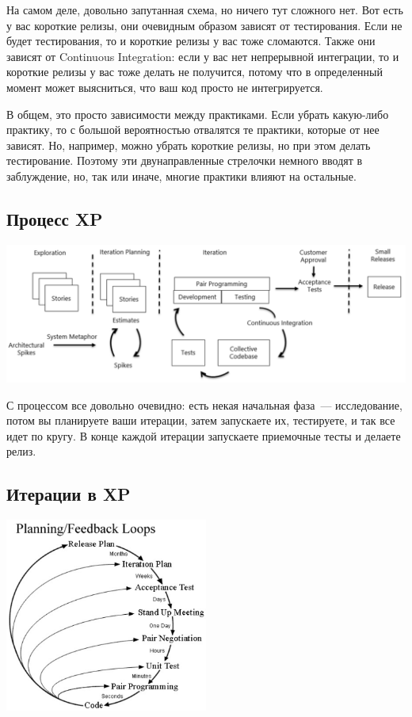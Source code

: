 \documentclass{../../text-style}
\begin{document}
На самом деле, довольно запутанная схема, но ничего тут сложного нет. Вот есть у вас короткие релизы, они очевидным образом зависят от тестирования. Если не будет тестирования, то и короткие релизы у вас тоже сломаются. Также они зависят от Continuous Integration: если у вас нет непрерывной интеграции, то и короткие релизы у вас тоже делать не получится, потому что в определенный момент может выясниться, что ваш код просто не интегрируется.

В общем, это просто зависимости между практиками. Если убрать какую-либо практику, то с большой вероятностью отвалятся те практики, которые от нее зависят. Но, например, можно убрать короткие релизы, но при этом делать тестирование. Поэтому эти двунаправленные стрелочки немного вводят в заблуждение, но, так или иначе, многие практики влияют на остальные.

\subsection{Процесс XP}

\begin{center}
    \includegraphics[width=\textwidth]{xpProcess.png}
\end{center}

С процессом все довольно очевидно: есть некая начальная фаза~--- исследование, потом вы планируете ваши итерации, затем запускаете их, тестируете, и так все идет по кругу. В конце каждой итерации запускаете приемочные тесты и делаете релиз.

\subsection{Итерации в XP}

\begin{center}
    \includegraphics[width=0.5\textwidth]{xpIterations.png}
\end{center}
\end{document}
